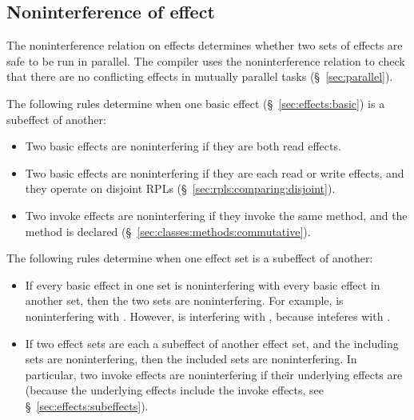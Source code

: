 \subsection{Noninterference of effect%
\label{sec:effects:nonint}}

The noninterference relation on effects determines whether two sets of
effects are safe to be run in parallel.  The compiler uses the
noninterference relation to check that there are no conflicting
effects in mutually parallel tasks (\S~\ref{sec:parallel}).

  The following rules determine when one basic
effect (\S~\ref{sec:effects:basic}) is a subeffect of another:
%
\begin{itemize}
%
\item Two basic effects are noninterfering if they are both read
  effects.
%
\item Two basic effects are noninterfering if they are each read or
  write effects, and they operate on disjoint RPLs
  (\S~\ref{sec:rpls:comparing:disjoint}).
%
\item Two invoke effects are noninterfering if they invoke the same
  method, and the method is declared 
  (\S~\ref{sec:classes:methods:commutative}).
%
\end{itemize}

  The following rules determine when one effect
set is a subeffect of another:
%
\begin{itemize}
%
\item If every basic effect in one set is noninterfering with every
  basic effect in another set, then the two sets are noninterfering.
  For example,  is noninterfering with
  .  However,  is interfering
  with , because  inteferes with
  .
%
\item If two effect sets are each a subeffect of another effect set,
  and the including sets are noninterfering, then the included sets
  are noninterfering.  In particular, two invoke effects are
  noninterfering if their underlying effects are (because the
  underlying effects include the invoke effects, see
  \S~\ref{sec:effects:subeffects}).
%
\end{itemize}
